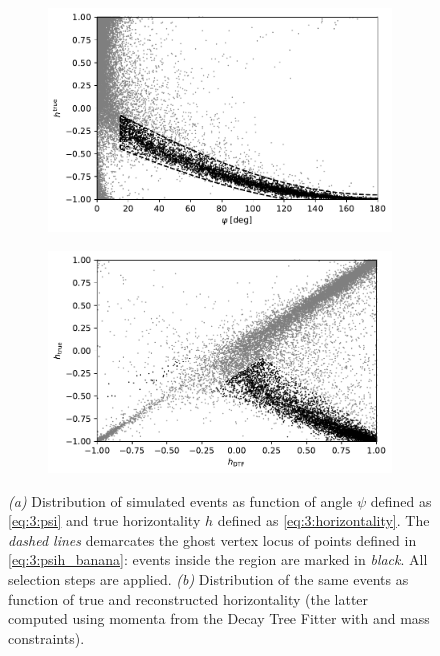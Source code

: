 \begin{figure}[t]
	\centering
	\begin{subfigure}{.45\textwidth}
		\includegraphics[width=\textwidth]{graphics/03-vertex_reconstruction/psi_vs_htrue.pdf}
		\caption{}
		\label{fig:3:psi_vs_htrue}
	\end{subfigure}
	\begin{subfigure}{.45\textwidth}
		\includegraphics[width=\textwidth]{graphics/03-vertex_reconstruction/hreco_vs_htrue.pdf}
		\caption{}
		\label{fig:3:hreco_vs_htrue}
	\end{subfigure}
	\caption{\textit{(a)} Distribution of simulated \demonstratorshort events as function of angle $\psi$ defined as \eqref{eq:3:psi} and true horizontality $h$ defined as \eqref{eq:3:horizontality}. The \textit{dashed lines} demarcates the ghost vertex locus of points defined in \eqref{eq:3:psih_banana}: events inside the region are marked in \textit{black}. All selection steps are applied. \textit{(b)} Distribution of the same events as function of true and reconstructed horizontality (the latter computed using momenta from the Decay Tree Fitter with \jpsi and \lz mass constraints).}
\end{figure}

